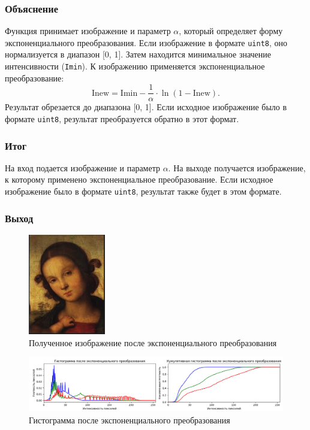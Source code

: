 \documentclass[a4paper,12pt]{article}
\begin{document}
\subsubsection{Объяснение}
Функция принимает изображение и параметр \( \alpha \), который определяет форму экспоненциального преобразования. Если изображение в формате \texttt{uint8}, оно нормализуется в диапазон [0, 1]. Затем находится минимальное значение интенсивности (\texttt{Imin}). К изображению применяется экспоненциальное преобразование:
\[
\text{Inew} = \text{Imin} - \frac{1}{\alpha} \cdot \ln(1 - \text{Inew}).
\]
Результат обрезается до диапазона [0, 1]. Если исходное изображение было в формате \texttt{uint8}, результат преобразуется обратно в этот формат.

\subsubsection{Итог}
На вход подается изображение и параметр \( \alpha \). На выходе получается изображение, к которому применено экспоненциальное преобразование. Если исходное изображение было в формате \texttt{uint8}, результат также будет в этом формате.

\subsubsection{Выход}

\begin{figure}[H]
    \centering
    \includegraphics[width=0.3\textwidth]{im/imЭкспонента.png}
    \caption{Полученное изображение после экспоненциального преобразования}
    \label{fig:exponential_image}
\end{figure}

\begin{figure}[H]
    \centering
    \includegraphics[width=1\textwidth]{im/гистограммаЭкспонента.png}
    \caption{Гистограмма после экспоненциального преобразования}
    \label{fig:exponential_histogram}
\end{figure}
\end{document}
